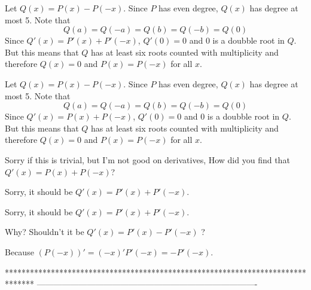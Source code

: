 \begin{solution}
	Let $Q(x)=P(x)-P(-x)$. Since $P$ has even degree, $Q(x)$ has degree at most 5. Note that $$Q(a)=Q(-a)=Q(b)=Q(-b)=Q(0)$$
Since $Q'(x)=P'(x)+P'(-x)$, $Q'(0)=0$ and $0$ is a doubble root in $Q$. But this means that $Q$ has at least six roots counted with multiplicity and therefore $Q(x)=0$ and $P(x)=P(-x)$ for all $x$.
\end{solution}



\begin{solution}
	\begin{tcolorbox}Let $Q(x)=P(x)-P(-x)$. Since $P$ has even degree, $Q(x)$ has degree at most 5. Note that $$Q(a)=Q(-a)=Q(b)=Q(-b)=Q(0)$$
Since $Q'(x)=P(x)+P(-x)$, $Q'(0)=0$ and $0$ is a doubble root in $Q$. But this means that $Q$ has at least six roots counted with multiplicity and therefore $Q(x)=0$ and $P(x)=P(-x)$ for all $x$.\end{tcolorbox}
Sorry if this is trivial, but I'm not good on derivatives,
How did you find that $Q'(x)=P(x)+P(-x)$?

\end{solution}



\begin{solution}
	Sorry, it should be $Q'(x)=P'(x)+P'(-x)$.
\end{solution}



\begin{solution}
	\begin{tcolorbox}Sorry, it should be $Q'(x)=P'(x)+P'(-x)$.\end{tcolorbox}
Why? Shouldn't it be $Q'(x)=P'(x)-P'(-x)$ ?
\end{solution}



\begin{solution}
	Because $(P(-x))'=(-x)'P'(-x)=-P'(-x)$.
\end{solution}
*******************************************************************************
-------------------------------------------------------------------------------


